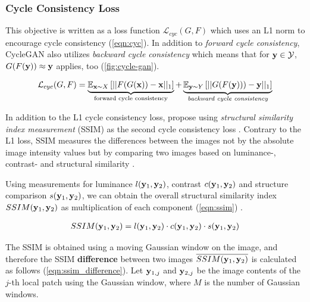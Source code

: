\subsubsection*{Cycle Consistency Loss}
This objective is written as a loss function $\mathcal{L}_{cyc}(G, F)$ which uses an L1 norm to encourage cycle consistency (\autoref{eqn:cyc}).
In addition to \textit{forward cycle consistency}, CycleGAN also utilizes \textit{backward cycle consistency} which means that for $\mathbf{y} \in \mathcal{Y}$, $G(F(\mathbf{y})) \approx \mathbf{y}$ \parencite{cyclegan-original} applies, too (\autoref{fig:cycle-gan}).

\begin{equation}
   \label{eqn:cyc}
   \begin{aligned}
      \mathcal{L}_{cyc}(G, F) = \underbrace{\mathbb{E}_{\mathbf{x} \sim X}\left[||F(G(\mathbf{x})) - \mathbf{x}||_1\right]}_{\text{forward cycle consistency}} +
      \underbrace{\mathbb{E}_{\mathbf{y} \sim Y}\left[||G(F(\mathbf{y}))) - \mathbf{y}||_1\right]}_{\textit{backward cycle consistency}}
   \end{aligned}
\end{equation}

In addition to the L1 cycle consistency loss, \citeauthor*{mehri} propose using \textit{structural similarity index measurement} (SSIM) as the second cycle consistency loss \parencite{mehri}.
Contrary to the L1 loss, SSIM measures the differences between the images not by the absolute image intensity values but by comparing two images based on luminance-, contrast- and structural similarity \parencite{ssim}.

Using measurements for luminance $l(\mathbf{y}_1, \mathbf{y}_2)$, contrast $c(\mathbf{y}_1,\mathbf{y}_2)$ and structure comparison $s(\mathbf{y}_1, \mathbf{y}_2)$, we can obtain the overall structural similarity
index $SSIM(\mathbf{y}_1, \mathbf{y}_2)$ as multiplication of each component (\autoref{eqn:ssim}) \parencite{ssim}.

\begin{equation}
   \label{eqn:ssim}
   \begin{aligned}
      SSIM(\mathbf{y}_1, \mathbf{y}_2) = l(\mathbf{y}_1, \mathbf{y}_2) \cdot c(\mathbf{y}_1,\mathbf{y}_2) \cdot s(\mathbf{y}_1, \mathbf{y}_2)
   \end{aligned}
\end{equation}

The SSIM is obtained using a moving Gaussian window on the image, and therefore the SSIM \textbf{difference} between two images $\overline{SSIM(\mathbf{y}_1,\mathbf{y}_2)}$ is calculated as follows (\autoref{eqn:ssim_difference}).
Let $\mathbf{y}_{1,j}$ and $\mathbf{y}_{2,j}$ be the image contents of the $j$-th local patch using the Gaussian window, where $M$ is the number of Gaussian windows.

